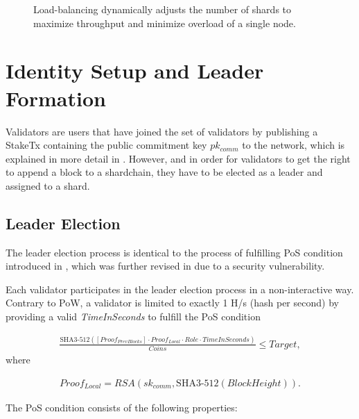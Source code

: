 \begin{figure}[hbt]
  \caption{Load-balancing dynamically adjusts the number of shards to maximize throughput and minimize overload of a single node.}
\end{figure}

\section{Identity Setup and Leader Formation}

Validators are users that have joined the set of validators by publishing a StakeTx containing the public commitment key $pk_{comm}$ to the network, which is explained in more detail in \cite{Blum18}. However, and in order for validators to get the right to append a block to a shardchain, they have to be elected as a leader and assigned to a shard.

\subsection{Leader Election}
\label{Design:LeaderElection}

The leader election process is identical to the process of fulfilling PoS condition introduced in \cite{Bachmann18}, which was further revised in \cite{Blum18} due to a security vulnerability. 

Each validator participates in the leader election process in a non-interactive way. Contrary to PoW, a validator is limited to exactly 1 H/s (hash per second) by providing a valid \textit{TimeInSeconds} to fulfill the PoS condition  

\begin{gather}
\label{eq:PoSCondition}
  {\frac{\text{SHA3-512}([Proof_{PrevBlocks}] \cdot Proof_{Local} \cdot Role \cdot TimeInSeconds)}{Coins}} \leq Target,
\end{gather}
\noindent where

\begin{gather}
  Proof_{Local} = RSA(sk_{comm}, \text{SHA3-512}(BlockHeight)).
\end{gather}

\noindent
The PoS condition consists of the following properties:

